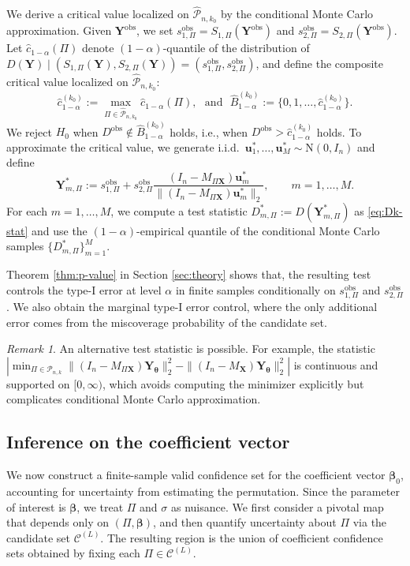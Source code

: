 \documentclass[11pt, reqno]{amsart}
\renewcommand{\hat}{\widehat}
\newcommand{\mP}{\mathcal{P}}
\newcommand{\1}{\mbox{1}\hspace{-0.25em}\mbox{l}}
\newcommand{\obs}{\mathrm{obs}}
\newcommand{\Normal}{\mathrm{N}}
\theoremstyle{definition}\newtheorem{problem}{Problem}[section]
\theoremstyle{definition}\newtheorem{definition}[problem]{Definition}
\theoremstyle{remark}\newtheorem{assumption}{Assumption}
\theoremstyle{remark}\newtheorem{remark}[problem]{Remark}
\theoremstyle{definition}\newtheorem{example}[problem]{Example}
\theoremstyle{plain}\newtheorem{theorem}[problem]{Theorem}
\theoremstyle{plain}\newtheorem{question}[problem]{Question}
\theoremstyle{plain}\newtheorem{lemma}[problem]{Lemma}
\theoremstyle{plain}\newtheorem{proposition}[problem]{Proposition}
\theoremstyle{plain}\newtheorem{corollary}[problem]{Corollary}
\theoremstyle{plain}\newtheorem{conjecture}[problem]{Conjecture}
\begin{document}
We derive a critical value localized on $\hat{\mP}_{n,k_0}$ by the conditional Monte Carlo approximation.
Given $\bm Y^{\obs}$, we set $s_{1,\Pi}^{\obs}=S_{1,\Pi}(\bm Y^{\obs})$ and $s_{2,\Pi}^{\obs}=S_{2,\Pi}(\bm Y^{\obs})$. 
Let $\widehat c_{1-\alpha}(\Pi)$ denote $(1-\alpha)$-quantile of the distribution of $D(\bm Y) \mid (S_{1,\Pi}(\bm Y),S_{2,\Pi}(\bm Y)) =(s_{1,\Pi}^{\obs}, s_{2,\Pi}^{\obs})$, and define the composite critical value localized on $\hat{\mP}_{n,k_0}$:
\begin{equation}\label{eq:critical-value-composite}
    \widehat c_{1-\alpha}^{(k_0)}:=\max_{\Pi\in\hat{\mP}_{n,k_0}}\widehat c_{1-\alpha}(\Pi), \mbox{~~and~~}
     \hat B^{(k_0)}_{1-\alpha}:=\{0,1,\ldots,\widehat c_{1-\alpha}^{(k_0)}\}.
\end{equation}
We reject $H_0$ when $D^{\obs}\notin \hat B^{(k_0)}_{1-\alpha}$ holds, i.e., when $D^{\obs}>\hat c_{1-\alpha}^{(k_0)}$ holds. To approximate the critical value, we generate i.i.d.\ $\bm u_1^*,\ldots,\bm u_M^*\sim\Normal(0,I_n)$ and define
\[
    \bm Y_{m,\Pi}^*:=s_{1,\Pi}^{\obs}+s_{2,\Pi}^{\obs}\frac{(I_n-M_{\Pi\bm X})\bm u_m^*}{\|(I_n-M_{\Pi\bm X})\bm u_m^*\|_2},
    \qquad m=1,\ldots,M.
\]
For each $m=1,\dots, M$, we compute a test statistic $D_{m,\Pi}^*:=D(\bm Y_{m,\Pi}^*)$ as \eqref{eq:Dk-stat} and use the $(1-\alpha)$-empirical quantile of the conditional Monte Carlo samples $\{ D_{m,\Pi}^*\}_{m=1}^M$.

Theorem \ref{thm:p-value} in Section \ref{sec:theory} shows that, the resulting test controls the type-I error at level $\alpha$ in finite samples conditionally on $s_{1,\Pi}^{\obs}$ and $s_{2,\Pi}^{\obs}$. We also obtain the marginal type-I error control, where the only additional error comes from the miscoverage probability of the candidate set.

\begin{remark}
An alternative test statistic is possible. For example, the statistic $| \min_{\Pi \in \mP_{n,k}}\| (I_n - M_{\Pi \bm{X}}) \bm{Y}_{\bm{\theta}}\|_2^2 - \| (I_n - M_{\bm{X}}) \bm{Y}_{\bm{\theta}}\|_2^2 |$
is continuous and supported on $[0,\infty)$, which avoids computing the minimizer explicitly but complicates conditional Monte Carlo approximation.
\end{remark}



\subsection{Inference on the coefficient vector}\label{subsec:coef}
We now construct a finite-sample valid confidence set for the coefficient vector $\bm{\beta}_0$, accounting for uncertainty from estimating the permutation. Since the parameter of interest is $\bm{\beta}$, we treat $\Pi$ and $\sigma$ as nuisance. We first consider a pivotal map that depends only on $(\Pi, \bm{\beta})$, and then quantify uncertainty about $\Pi$ via the candidate set $\mathcal{C}^{(L)}$. The resulting region is the union of coefficient confidence sets obtained by fixing each $\Pi \in \mathcal{C}^{(L)}$.
\end{document}

